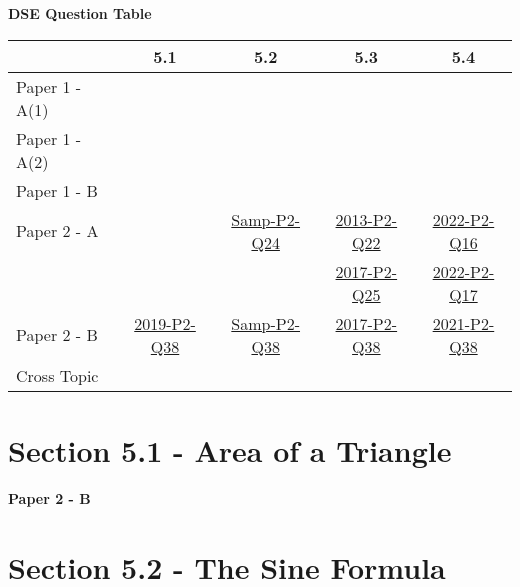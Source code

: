 \documentclass[12pt, a4paper]{article}
\begin{document}
\begin{absolutelynopagebreak}
\begin{center}
\textbf{DSE Question Table}
\end{center}
\begin{center}
\begin{tabular}{|l|c|c|c|c|}
\hline
        & 5.1 & 5.2 & 5.3 & 5.4 \\\hline
\hline
Paper 1 - A(1)&  &  &  &  \\
\hline
Paper 1 - A(2)&  &  &  &  \\
\hline
Paper 1 - B&  &  &  &  \\
\hline
\hline
Paper 2 - A&  & \hyperref[DSE2012S-CoreP2-Q24]{Samp-P2-Q24} & \hyperref[DSE2013-CoreP2-Q22]{2013-P2-Q22} & \hyperref[DSE2022-CoreP2-Q16]{2022-P2-Q16} \\
&  &  & \hyperref[DSE2017-CoreP2-Q25]{2017-P2-Q25} & \hyperref[DSE2022-CoreP2-Q17]{2022-P2-Q17} \\
\hline
Paper 2 - B& \hyperref[DSE2019-CoreP2-Q38]{2019-P2-Q38} & \hyperref[DSE2012S-CoreP2-Q38]{Samp-P2-Q38} & \hyperref[DSE2017-CoreP2-Q38]{2017-P2-Q38} & \hyperref[DSE2021-CoreP2-Q38]{2021-P2-Q38} \\
\hline
\hline
Cross Topic&  &  &  &  \\
\hline
\end{tabular}
\end{center}
\end{absolutelynopagebreak}




\section*{Section 5.1 - Area of a Triangle \NF}\label{section:5-5-1}

\textbf{Paper 2 - B}
\begin{enumx}[label=\arabic*.,start=1]
\item {}\label{DSE2019-CoreP2-Q38} 
\end{enumx}




\section*{Section 5.2 - The Sine Formula \NF}\label{section:5-5-2}
\end{document}
